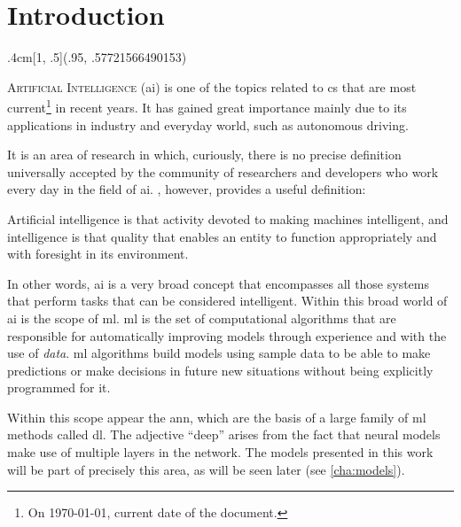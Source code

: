 

\chapter{Introduction}\label{cha:intro}

\begin{textblock*}{.4cm}[1, .5](.95\layoutwidth, .57721566490153\layoutheight)
  \noindent\resizebox{.4cm}{!}{\(\gamma\)}
\end{textblock*}



\lettrine{A}{rtificial Intelligence} (\acs{ai})
is one of the topics related to \gls{cs} that are most current\footnote{On
  \today, current date of the document.} in recent years. It has gained great
importance mainly due to its applications in industry and everyday world, such
as autonomous driving.

It is an area of research in which, curiously, there is no precise definition
universally accepted by the community of researchers and developers who work
every day in the field of \gls{ai}. ,
however, provides a useful definition:
\begin{quoteBox}
  Artificial intelligence is that activity devoted to making machines
  intelligent, and intelligence is that quality that enables an entity to
  function appropriately and with foresight in its environment.
  \tcblower{}
\end{quoteBox}

In other words, \gls{ai} is a very broad concept that encompasses all those
systems that perform tasks that can be considered intelligent. Within this
broad world of \gls{ai} is the scope of \gls{ml}. \Gls{ml} is the set of computational algorithms that are
responsible for automatically improving models through experience and with the
use of \emph{data}. \Gls{ml} algorithms build models using sample data to be
able to make predictions or make decisions in future new situations without
being explicitly programmed for it.

Within this scope appear the \gls{ann}, which are the basis of a large family
of \gls{ml} methods called \gls{dl}. The adjective
``deep'' arises from the fact that neural models make use of multiple layers in
the network. The models presented in this work will be part of precisely this
area, as will be seen later (see \vref{cha:models}).

